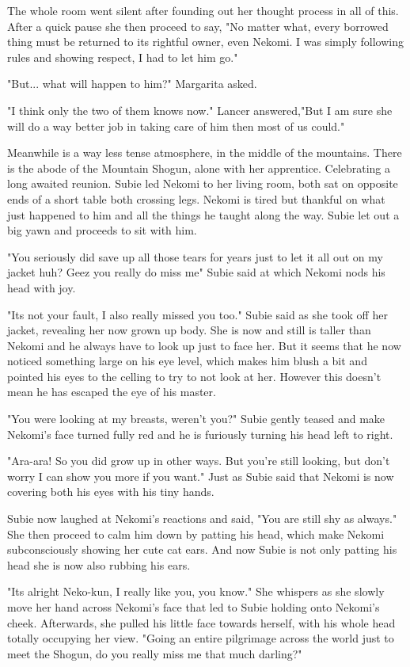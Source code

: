 The whole room went silent after founding out her thought process in all of this. 
After a quick pause she then proceed to say, "No matter what, every borrowed thing must be returned to its rightful owner, even Nekomi. I was simply following rules and showing respect, I had to let him go."

"But... what will happen to him?" Margarita asked. 

"I think only the two of them knows now." Lancer answered,"But I am sure she will do a way better job in taking care of him then most of us could."

Meanwhile is a way less tense atmosphere, in the middle of the mountains. 
There is the abode of the Mountain Shogun, alone with her apprentice. 
Celebrating a long awaited reunion. 
Subie led Nekomi to her living room, both sat on opposite ends of a short table both crossing legs. 
Nekomi is tired but thankful on what just happened to him and all the things he taught along the way. 
Subie let out a big yawn and proceeds to sit with him. 

"You seriously did save up all those tears for years just to let it all out on my jacket huh? Geez you really do miss me" Subie said at which Nekomi nods his head with joy.

"Its not your fault, I also really missed you too." Subie said as she took off her jacket, revealing her now grown up body. 
She is now and still is taller than Nekomi and he always have to look up just to face her. 
But it seems that he now noticed something large on his eye level, which makes him blush a bit and pointed his eyes to the celling to try to not look at her.
However this doesn't mean he has escaped the eye of his master.

"You were looking at my breasts, weren't you?" Subie gently teased and make Nekomi's face turned fully red and he is furiously turning his head left to right.

"Ara-ara! So you did grow up in other ways. But you're still looking, but don't worry I can show you more if you want." Just as Subie said that Nekomi is now covering both his eyes with his tiny hands.

Subie now laughed at Nekomi's reactions and said, "You are still shy as always." She then proceed to calm him down by patting his head, which make Nekomi subconsciously showing her cute cat ears. And now Subie is not only patting his head she is now also rubbing his ears.

"Its alright Neko-kun, I really like you, you know." She whispers as she slowly move her hand across Nekomi's face that led to Subie holding onto Nekomi's cheek. Afterwards, she pulled his little face towards herself, with his whole head totally occupying her view. "Going an entire pilgrimage across the world just to meet the Shogun, do you really miss me that much darling?"

